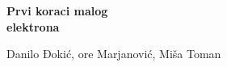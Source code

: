 \documentclass{article}
\begin{document}
   \vfill

   \begin{center}\bf
   \large Prvi koraci malog \\
   \Huge elektrona
   \end{center}

   \vfill
     Danilo Đokić, \DJ or\dj e Marjanovi\'c, Mi\v sa Toman
   \vfill
\end{document}
